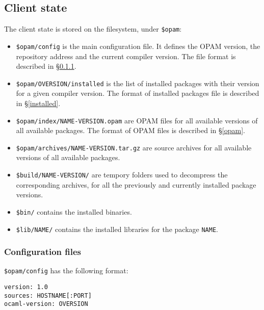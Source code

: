\documentclass[a4paper,11pt]{article}
\begin{document}
\subsection{Client state}
\label{client}

The client state is stored on the filesystem, under {\tt \$opam}:

\begin{itemize}

\item {\tt \$opam/config} is the main configuration file. It defines
  the OPAM version, the repository address and the current compiler
  version. The file format is described in \S\ref{config}.

\item {\tt \$opam/OVERSION/installed} is the list of installed
  packages with their version for a given compiler version. The format
  of installed packages file is described in \S\ref{installed}.

\item {\tt \$opam/index/NAME-VERSION.opam} are OPAM files for all
  available versions of all available packages. The format of OPAM
  files is described in \S\ref{opam}.

\item {\tt \$opam/archives/NAME-VERSION.tar.gz} are source archives
  for all available versions of all available packages.

\item {\tt \$build/NAME-VERSION/} are tempory folders used to
  decompress the corresponding archives, for all the previously and
  currently installed package versions.

\item {\tt \$bin/} contains the installed binaries.

\item {\tt \$lib/NAME/} contains the installed libraries for the
  package {\tt NAME}.

\end{itemize}

\subsubsection{Configuration files}
\label{config}

{\tt \$opam/config} has the following format:

\begin{verbatim}
version: 1.0
sources: HOSTNAME[:PORT]
ocaml-version: OVERSION
\end{verbatim}
\end{document}
